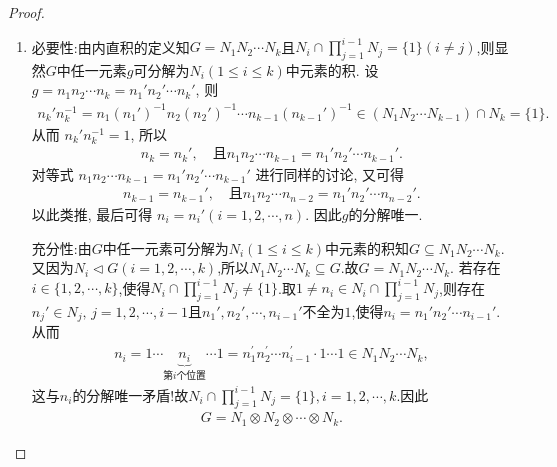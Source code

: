 \documentclass[../../main.tex]{subfiles}%
\begin{document}
\begin{proof}
\begin{enumerate}[(1)]
\item {\heiti 必要性:}由内直积的定义知$G=N_1N_2\cdots N_k$且$N_i\cap \prod_{j=1}^{i-1}{N_j}=\{1\}(i\ne j)$,则显然$G$中任一元素$g$可分解为$N_i(1\leqslant i\leqslant k)$中元素的积.
设 $g=n_1 n_2 \cdots n_k = n_1' n_2' \cdots n_k'$, 则
\begin{align*}
n_k' n_k^{-1} = n_1 (n_1')^{-1} n_2 (n_2')^{-1} \cdots n_{k-1} (n_{k-1}')^{-1} \in (N_1 N_2 \cdots N_{k-1}) \cap N_k = \{1\}.
\end{align*}
从而 $n_k' n_k^{-1} = 1$, 所以
\begin{align*}
n_k = n_k', \quad \text{且} n_1 n_2 \cdots n_{k-1} = n_1' n_2' \cdots n_{k-1}'.
\end{align*}
对等式 $n_1 n_2 \cdots n_{k-1} = n_1' n_2' \cdots n_{k-1}'$ 进行同样的讨论, 又可得
\begin{align*}
n_{k-1} = n_{k-1}', \quad \text{且} n_1 n_2 \cdots n_{n-2} = n_1' n_2' \cdots n_{n-2}'.
\end{align*}
以此类推, 最后可得 $n_i = n_i' (i = 1,2,\cdots,n)$.
因此$g$的分解唯一.

{\heiti 充分性:}由$G$中任一元素可分解为$N_i(1\leqslant i\leqslant k)$中元素的积知$G\subseteq N_1N_2\cdots N_k$.又因为$N_i\lhd G(i=1,2,\cdots,k)$,所以$N_1N_2\cdots N_k\subseteq G$.故$G=N_1N_2\cdots N_k$.
若存在$i\in\{1,2,\cdots,k\}$,使得$N_i\cap \prod_{j=1}^{i-1}{N_j}\ne\{1\}$.取$1\neq n_i\in N_i\cap \prod_{j=1}^{i-1}{N_j}$,则存在$n_j'\in N_j,\,j=1,2,\cdots,i-1$且$n_1',n_2',\cdots,n_{i-1}'$不全为$1$,使得$n_i=n_1'n_2'\cdots n_{i-1}'$.从而
\begin{align*}
n_i=1\cdots \underset{\text{第}i\text{个位置}}{\underbrace{n_i}}\cdots 1=n_{1}^{\prime}n_{2}^{\prime}\cdots n_{i-1}^{\prime}\cdot 1\cdots 1\in N_1N_2\cdots N_k,
\end{align*}
这与$n_i$的分解唯一矛盾!故$N_i\cap \prod_{j=1}^{i-1}{N_j}=\{1\},i=1,2,\cdots,k$.因此
\begin{align*}
G=N_1\otimes N_2\otimes\cdots\otimes N_k.
\end{align*}
\end{enumerate}
\end{proof}
\end{document}

